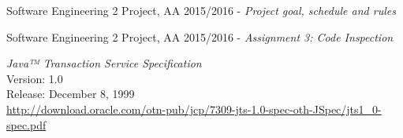 \begin{thebibliography}{1}
    	Software Engineering 2 Project, AA 2015/2016 - \emph{Project goal, schedule and rules}

    	Software Engineering 2 Project, AA 2015/2016 - \emph{Assignment 3: Code Inspection}

    \emph{Java™ Transaction Service Specification}\\
    Version: 1.0\\
    Release: December 8, 1999\\
    \url{http://download.oracle.com/otn-pub/jcp/7309-jts-1.0-spec-oth-JSpec/jts1_0-spec.pdf}
\end{thebibliography}
